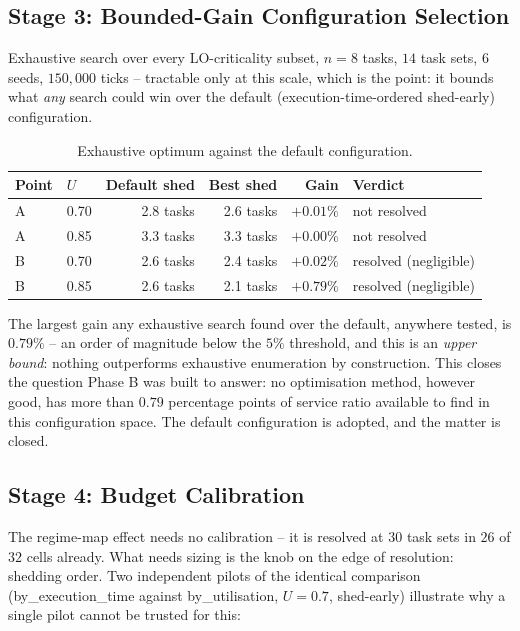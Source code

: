 \subsection{Stage 3: Bounded-Gain Configuration Selection}
\label{sec:bounded-gain-results}

Exhaustive search over every LO-criticality subset, $n=8$ tasks, $14$ task
sets, $6$ seeds, $150{,}000$ ticks -- tractable only at this scale, which is
the point: it bounds what \emph{any} search could win over the default
(execution-time-ordered shed-early) configuration.

\begin{table}[h]
\centering
\caption{Exhaustive optimum against the default configuration.}
\label{tab:bounded-gain}
\begin{tabular}{llrrrl}
\toprule
Point & $U$ & Default shed & Best shed & Gain & Verdict \\
\midrule
A & 0.70 & 2.8 tasks & 2.6 tasks & $+0.01\%$ & not resolved \\
A & 0.85 & 3.3 tasks & 3.3 tasks & $+0.00\%$ & not resolved \\
B & 0.70 & 2.6 tasks & 2.4 tasks & $+0.02\%$ & resolved (negligible) \\
B & 0.85 & 2.6 tasks & 2.1 tasks & $+0.79\%$ & resolved (negligible) \\
\bottomrule
\end{tabular}
\end{table}

\noindent The largest gain any exhaustive search found over the default,
anywhere tested, is $0.79\%$ -- an order of magnitude below the $5\%$
threshold, and this is an \emph{upper bound}: nothing outperforms exhaustive
enumeration by construction. This closes the question Phase B was built to
answer: no optimisation method, however good, has more than $0.79$ percentage
points of service ratio available to find in this configuration space. The
default configuration is adopted, and the matter is closed.

\subsection{Stage 4: Budget Calibration}
\label{sec:budget-calibration-results}

The regime-map effect needs no calibration -- it is resolved at $30$ task sets
in $26$ of $32$ cells already. What needs sizing is the knob on the edge of
resolution: shedding order. Two independent pilots of the identical comparison
(by\_execution\_time against by\_utilisation, $U=0.7$, shed-early) illustrate
why a single pilot cannot be trusted for this:

